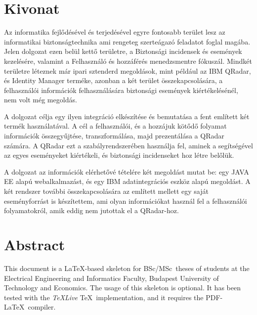 \setcounter{page}{1}

\selecthungarian

\chapter*{Kivonat}

Az informatika fejlődésével és terjedésével egyre fontosabb terület lesz az informatikai biztonságtechnika ami rengeteg szerteágazó feladatot foglal magába. Jelen dolgozat ezen belül kettő területre, a Biztonsági incidensek és események kezelésére, valamint a Felhasználó és hozzáférés menedzsmentre fókuszál. Mindkét területre léteznek már ipari sztenderd megoldások, mint például az IBM QRadar, és Identity Manager terméke, azonban a két terület összekapcsolására, a felhasználói információk felhasználására biztonsági események kiértékelésénél, nem volt még megoldás. 

A dolgozat célja egy ilyen integráció elkészítése és bemutatása a fent említett két termék használatával. A cél a felhasználói, és a hozzájuk kötődő folyamat információk összegyűjtése, transzformálása, majd prezentálása a QRadar számára. A QRadar ezt a szabályrendszerében használja fel, aminek a segítségével az egyes eseményeket kiértékeli, és biztonsági incidenseket hoz létre belőlük.

A dolgozat az információk elérhetővé tételére két megoldást mutat be: egy JAVA EE alapú webalkalmazást, és egy IBM adatintegrációs eszköz alapú megoldást. A két rendszer további összekapcsolására az említett mellett egy saját eseményforrást is készítettem, ami olyan információkat használ fel a felhasználói folyamatokról, amik eddig nem jutottak el a QRadar-hoz.


\vfill
\selectenglish


\chapter*{Abstract}

This document is a \LaTeX-based skeleton for BSc/MSc~theses of students at the Electrical Engineering and Informatics Faculty, Budapest University of Technology and Economics. The usage of this skeleton is optional. It has been tested with the \emph{TeXLive} \TeX~implementation, and it requires the PDF-\LaTeX~compiler.


\vfill
\selectthesislanguage

\setcounter{romanPage}{\value{page}}
